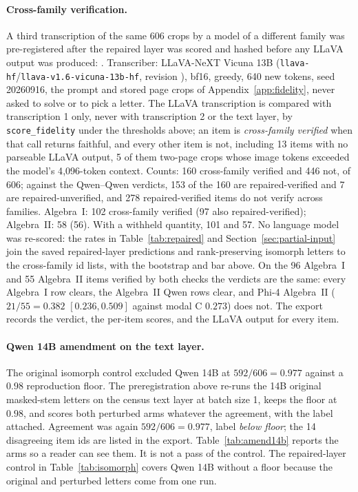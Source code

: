 \paragraph{Cross-family verification.}
A third transcription of the same 606 crops by a model of a different family was pre-registered after the repaired layer was scored and hashed before any LLaVA output was produced:
.
Transcriber: LLaVA-NeXT Vicuna 13B (\texttt{llava-hf}/\allowbreak\texttt{llava-v1.6-vicuna-13b-hf}, revision ), bf16, greedy, 640 new tokens, seed 20260916, the prompt and stored page crops of Appendix~\ref{app:fidelity}, never asked to solve or to pick a letter. The LLaVA transcription is compared with transcription 1 only, never with transcription 2 or the text layer, by \texttt{score\_fidelity} under the thresholds above; an item is \emph{cross-family verified} when that call returns faithful, and every other item is not, including 13 items with no parseable LLaVA output, 5 of them two-page crops whose image tokens exceeded the model's 4{,}096-token context. Counts: 160 cross-family verified and 446 not, of 606; against the Qwen--Qwen verdicts, 153 of the 160 are repaired-verified and 7 are repaired-unverified, and 278 repaired-verified items do not verify across families. Algebra~I: 102 cross-family verified (97 also repaired-verified); Algebra~II: 58 (56). With a withheld quantity, 101 and 57. No language model was re-scored: the rates in Table~\ref{tab:repaired} and Section~\ref{sec:partial-input} join the saved repaired-layer predictions and rank-preserving isomorph letters to the cross-family id lists, with the bootstrap and bar above. On the 96 Algebra~I and 55 Algebra~II items verified by both checks the verdicts are the same: every Algebra~I row clears, the Algebra~II Qwen rows clear, and Phi-4 Algebra~II ($21/55=0.382$ $[0.236, 0.509]$ against modal C $0.273$) does not. The export records the verdict, the per-item scores, and the LLaVA output for every item.

\paragraph{Qwen 14B amendment on the text layer.}
The original isomorph control excluded Qwen 14B at $592/606=0.977$ against a $0.98$ reproduction floor. The preregistration above re-runs the 14B original masked-stem letters on the census text layer at batch size 1, keeps the floor at $0.98$, and scores both perturbed arms whatever the agreement, with the label attached. Agreement was again $592/606=0.977$, label \emph{below floor}; the 14 disagreeing item ids are listed in the export. Table~\ref{tab:amend14b} reports the arms so a reader can see them. It is not a pass of the control. The repaired-layer control in Table~\ref{tab:isomorph} covers Qwen 14B without a floor because the original and perturbed letters come from one run.

